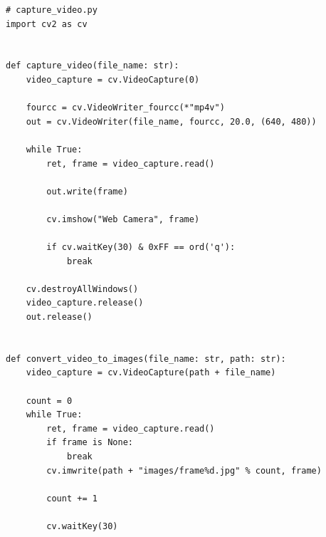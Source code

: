 \documentclass[a4paper, 12pt]{article}
\begin{document}
	\begin{lstlisting}
# capture_video.py
import cv2 as cv


def capture_video(file_name: str):
    video_capture = cv.VideoCapture(0)

    fourcc = cv.VideoWriter_fourcc(*"mp4v")
    out = cv.VideoWriter(file_name, fourcc, 20.0, (640, 480))

    while True:
        ret, frame = video_capture.read()

        out.write(frame)

        cv.imshow("Web Camera", frame)

        if cv.waitKey(30) & 0xFF == ord('q'):
            break

    cv.destroyAllWindows()
    video_capture.release()
    out.release()


def convert_video_to_images(file_name: str, path: str):
    video_capture = cv.VideoCapture(path + file_name)

    count = 0
    while True:
        ret, frame = video_capture.read()
        if frame is None:
            break
        cv.imwrite(path + "images/frame%d.jpg" % count, frame)

        count += 1

        cv.waitKey(30)

	\end{lstlisting}
\end{document}
